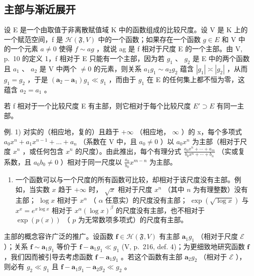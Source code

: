 \subsection{主部与渐近展开}

设 E 是一个由取值于非离散赋值域 K 中的函数组成的比较尺度。设 V 是 K 上的一个赋范空间，f 是 \(\mathcal{H}(\mathfrak{F}, V)\) 中的一个函数；如果存在一个函数 \(g \in E\) 和 V 中的一个元素 \(a \neq 0\) 使得 \(f \sim ag\) ，就说 ag 是 f 相对于尺度 E 的一个主部。由 V, p.~10 的定义 1，f 相对于 E 只能有一个主部，因为若 \(g_{1}\) 、 \(g_{2}\) 是 E 中的两个函数且 \(a_{1}\) 、 \(a_{2}\) 是 V 中两个 \(\neq 0\) 的元素，则关系 \(a_{1}g_{1} \sim a_{2}g_{2}\) 蕴含 \(|g_{1}| \asymp |g_{2}|\) ，从而 \(g_{1} = g_{2}\) ，于是 \((\mathbf{a}_{2} - \mathbf{a}_{1})g_{1} \ll g_{1}\) ，而由于 \(g_{1}\) 在 E 的任何集上都不恒为零，这蕴含 \(a_{2} = a_{1}\) 。

若 f 相对于一个比较尺度 E 有主部，则它相对于每个比较尺度 \(E' \supset E\) 有同一主部。

例. 1) 对实的（相应地，复的）且趋于 \(+\infty\) （相应地， \(\infty\) ）的 x，每个多项式 \(a_{0}x^{n} + a_{1}x^{n-1} + \ldots + a_{n}\) （系数在 V 中，且 \(a_{0} \neq 0\) ）以 \(a_{0}x^{n}\) 为主部（相对于尺度 \(x^{n}\) ，或任何包含 \(x^{n}\) 的尺度）。由此推出，每个有理分式 \(\frac{a_{0}x^{n} + \cdots + a_{m}}{b_{0}x^{n} + \cdots + b_{n}}\) （实或复系数，且 \(a_{0}b_{0} \neq 0\) ）相对于同一尺度以 \(\frac{a_{0}}{b_{0}}x^{m-n}\) 为主部。

\begin{enumerate}
\def\labelenumi{\arabic{enumi})}
\setcounter{enumi}{1}
\tightlist
\item
  一个函数可以与一个尺度的所有函数可比较，却相对于该尺度没有主部。例如，当实数 \(x\) 趋于 \(+\infty\) 时， \(\sqrt{x}\) 相对于尺度 \(x^n\) （其中 \(n\) 为有理整数）没有主部； \(\log x\) 相对于 \(x^\alpha\) （ \(\alpha\) 任意实）的尺度没有主部； \(\exp(\sqrt{\log x})\) 与 \(x^x = e^{x\log x}\) 相对于 \(x^\alpha (\log x)^\beta\) 的尺度没有主部，也不相对于 \(\exp(p(x))\) （ \(p\) 为无常数项多项式）的尺度有主部。
\end{enumerate}

主部的概念容许广泛的推广。设函数 \(\mathbf{f} \in \mathcal{H}(\mathfrak{F}, V)\) 有主部 \(\mathbf{a}_1g_1\) （相对于尺度 \(\mathcal{E}\) ）；关系 \(\mathbf{f} \sim \mathbf{a}_1g_1\) 等价于 \(\mathbf{f} - \mathbf{a}_1g_1 \ll g_1\) (V, p.~216, def. 4)；为更细致地研究函数 \(\mathbf{f}\) ，我们因而被引导去考虑函数 \(\mathbf{f} - \mathbf{a}_1g_1\) 。若这个函数有主部 \(\mathbf{a}_2g_2\) （相对于 \(\mathcal{E}\) ），则必有 \(g_2 \ll g_1\) 且 \(\mathbf{f} - \mathbf{a}_1g_1 - \mathbf{a}_2g_2 \ll g_2\) 。

